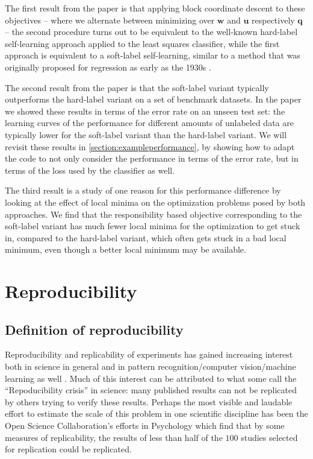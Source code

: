 \documentclass[runningheads,a4paper]{llncs}\usepackage[]{graphicx}\usepackage[]{color}
\begin{document}
The first result from the paper is that applying block coordinate descent to these objectives -- where we alternate between minimizing over $\mathbf{w}$ and $\mathbf{u}$ respectively $\mathbf{q}$ -- the second procedure turns out to be equivalent to the well-known hard-label self-learning approach applied to the least squares classifier, while the first approach is equivalent to a soft-label self-learning, similar to a method that was originally proposed for regression as early as the 1930s \cite{Healy1956}.

The second result from the paper is that the soft-label variant typically outperforms the hard-label variant on a set of benchmark datasets. In the paper we showed these results in terms of the error rate on an unseen test set: the learning curves of the performance for different amounts of unlabeled data are typically lower for the soft-label variant than the hard-label variant. We will revisit these results in \cref{section:exampleperformance}, by showing how to adapt the code to not only consider the performance in terms of the error rate, but in terms of the loss used by the classifier as well.

The third result is a study of one reason for this performance difference by looking at the effect of local minima on the optimization problems posed by both approaches. We find that the responsibility based objective corresponding to the soft-label variant has much fewer local minima for the optimization to get stuck in, compared to the hard-label variant, which often gets stuck in a bad local minimum, even though a better local minimum may be available.

\section{Reproducibility}

\subsection{Definition of reproducibility}
Reproducibility and replicability of experiments has gained increasing interest both in science in general \cite{Goodman2016a} and in pattern recognition/computer vision/machine learning as well \cite{Drummond2009}. Much of this interest can be attributed to what some call the ``Repoducibility crisis'' in science: many published results can not be replicated by others trying to verify these results. Perhaps the most visible and laudable effort to estimate the scale of this problem in one scientific discipline has been the Open Science Collaboration's efforts in Psychology \cite{OpenScienceCollaboration2015} which find that by some measures of replicability, the results of less than half of the $100$ studies selected for replication could be replicated.
\end{document}
